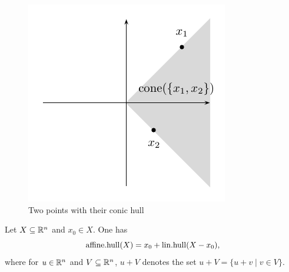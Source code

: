 \begin{figure}[htbp]
  \begin{center}{
   \includegraphics{figures/picture3.pdf}

    }
    
  \end{center}
  \caption{Two points with their conic hull}\label{conv:fig:4}
\end{figure}



\begin{proposition}
  \label{conv:prop:1}
  Let $X\subseteq\mathbb{R}^n$ and $x_0\in X$. One has 
  \begin{displaymath}
    \mathrm{affine.hull}(X) = x_0 + \mathrm{lin.hull}(X - x_0),
  \end{displaymath}
  where for $u \in \mathbb{R}^n$ and $V\subseteq\mathbb{R}^n$,   $u +V$ denotes the set
  $u+V = \{ u+v \mid v \in V\}$.
\end{proposition}


